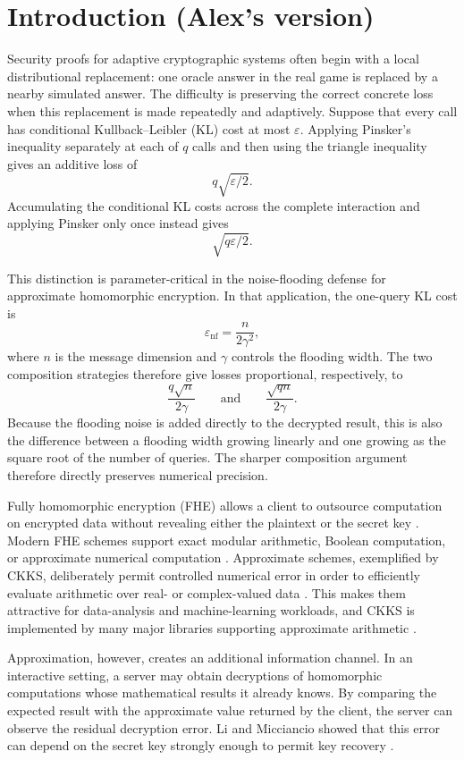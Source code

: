 \section{Introduction (Alex's version)}
\label{sec:introduction-alex}



Security proofs for adaptive cryptographic systems often begin with a local distributional replacement: one oracle answer in the real game is replaced by a nearby simulated answer. The difficulty is preserving the correct concrete loss when this replacement is made repeatedly and adaptively. Suppose that every call has conditional Kullback--Leibler (KL) cost at most $\varepsilon$. Applying Pinsker's inequality separately at each of $q$ calls and then using the triangle inequality gives an additive loss of
\[
q\sqrt{\varepsilon/2}.
\]
Accumulating the conditional KL costs across the complete interaction and applying Pinsker only once instead gives
\[
\sqrt{q\varepsilon/2}.
\]

This distinction is parameter-critical in the noise-flooding defense for approximate homomorphic encryption. In that application, the one-query KL cost is
\[
\varepsilon_{\mathrm{nf}}=\frac{n}{2\gamma^{2}},
\]
where $n$ is the message dimension and $\gamma$ controls the flooding width. The two composition strategies therefore give losses proportional, respectively, to
\[
\frac{q\sqrt{n}}{2\gamma}
\qquad\text{and}\qquad
\frac{\sqrt{qn}}{2\gamma}.
\]
Because the flooding noise is added directly to the decrypted result, this is also the difference between a flooding width growing linearly and one growing as the square root of the number of queries. The sharper composition argument therefore directly preserves numerical precision.

Fully homomorphic encryption (FHE) allows a client to outsource computation on encrypted data without revealing either the plaintext or the secret key \cite{rad78,gentry09}. Modern FHE schemes support exact modular arithmetic, Boolean computation, or approximate numerical computation \cite{fv12,tfhe,ckks}. Approximate schemes, exemplified by CKKS, deliberately permit controlled numerical error in order to efficiently evaluate arithmetic over real- or complex-valued data \cite{ckks}. This makes them attractive for data-analysis and machine-learning workloads, and CKKS is implemented by many major libraries supporting approximate arithmetic \cite{heprofiler}.

Approximation, however, creates an additional information channel. In an interactive setting, a server may obtain decryptions of homomorphic computations whose mathematical results it already knows. By comparing the expected result with the approximate value returned by the client, the server can observe the residual decryption error. Li and Micciancio showed that this error can depend on the secret key strongly enough to permit key recovery \cite{lm}.


